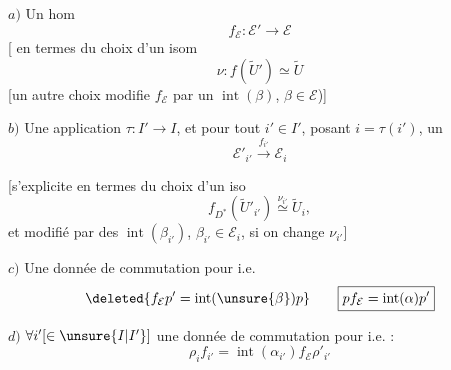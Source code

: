 $a)$ Un hom
\[
\boxed{\boxed{f_{\mathcal E}:\mathcal E'\longrightarrow\mathcal E}}
\]
[ en termes du choix d'un isom
\[
\nu:f(\widetilde U')\simeq\widetilde U
\]
[un autre choix modifie $f_{\mathcal E}$ par un $\operatorname{int}(\beta)$, $\beta\in\mathcal E$)]

$b)$ Une  application $\tau:I'\longrightarrow I$, et pour tout $i'\in I'$, posant $i=\tau(i')$, un 
\[
\boxed{\mathcal E'_{i'}\xrightarrow{f_{i'}}\mathcal E_i}
\]


[s'explicite en termes du choix d'un iso
\[
f_{D^*}(\widetilde U'_{i'})\overset{\nu_{i'}}{\simeq}\widetilde U_i,
\]
et modifié par des $\operatorname{int}(\beta_{i'})$, $\beta_{i'}\in\mathcal E_i$, si on change $\nu_{i'}$]

$c)$ Une donnée de commutation pour
i.e.
\[
\deleted{f_{\mathcal E}p'=\operatorname{int}(\unsure{\beta})p}
\qquad\boxed{pf_{\mathcal E}=\operatorname{int}(\alpha)p'}
\]

$d)$ $\forall i'[\in\unsure{I|I'}]$ une donnée de commutation pour
i.e. :
\[
\boxed{\rho_i f_{i'}=\operatorname{int}(\alpha_{i'})f_{\mathcal E}\rho'_{i'}}
\]


